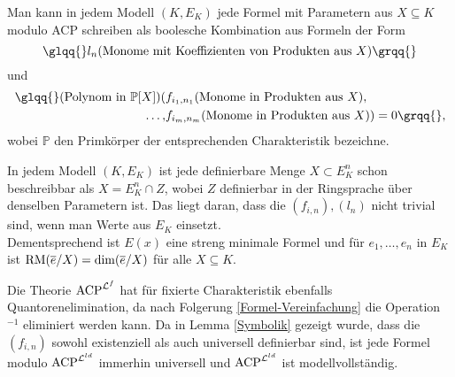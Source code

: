     \begin{corollary}\label{Formel-Vereinfachung}
    	Man kann in jedem Modell $(K,E_K)$ jede Formel mit Parametern aus $X\subseteq K$ modulo ACP schreiben als boolesche Kombination aus Formeln der Form $$\glqq{}l_n(\text{Monome mit Koeffizienten von Produkten aus }X)\grqq{}$$ und
    	\begin{align*}
    	\text{\glqq{}}(\text{Polynom in }\mathbb{P}[X])(&f_{i_1,n_1}(\text{Monome in Produkten aus }X),\\\dots,&f_{i_m,n_m}(\text{Monome in Produkten aus }X))=0\grqq{},
    	\end{align*}
        wobei $\mathbb{P}$ den Primkörper der entsprechenden Charakteristik bezeichne.
    \end{corollary}
    \begin{corollary}
    	In jedem Modell $(K,E_K)$ ist jede definierbare Menge $X\subset E_K^n$ schon beschreibbar als $X=E_K^n\cap Z$, wobei $Z$ definierbar in der Ringsprache über denselben Parametern ist. Das liegt daran, dass die $(f_{i,n}),(l_n)$ nicht trivial sind, wenn man Werte aus $E_K$ einsetzt.\\ Dementsprechend ist $E(x)$ eine streng minimale Formel und für $e_1,\dots,e_n$ in $E_K$ ist $\operatorname{RM}(\overline{e}/X)=\dim(\overline{e}/X)$ für alle $X\subseteq K$.
    \end{corollary}
    \begin{corollary}
    	Die Theorie $\operatorname{ACP}^{\mathcal{L}^f}$ hat für fixierte Charakteristik ebenfalls Quantorenelimination, da nach Folgerung \ref{Formel-Vereinfachung} die Operation \glqq{}$^{-1}$\grqq{} eliminiert werden kann. Da in Lemma \ref{Symbolik} gezeigt wurde, dass die $(f_{i,n})$ sowohl existenziell als auch universell definierbar sind, ist jede Formel modulo $\operatorname{ACP}^{\mathcal{L}^{ld}}$ immerhin universell und $\operatorname{ACP}^{\mathcal{L}^{ld}}$ ist modellvollständig.
    \end{corollary}
    
